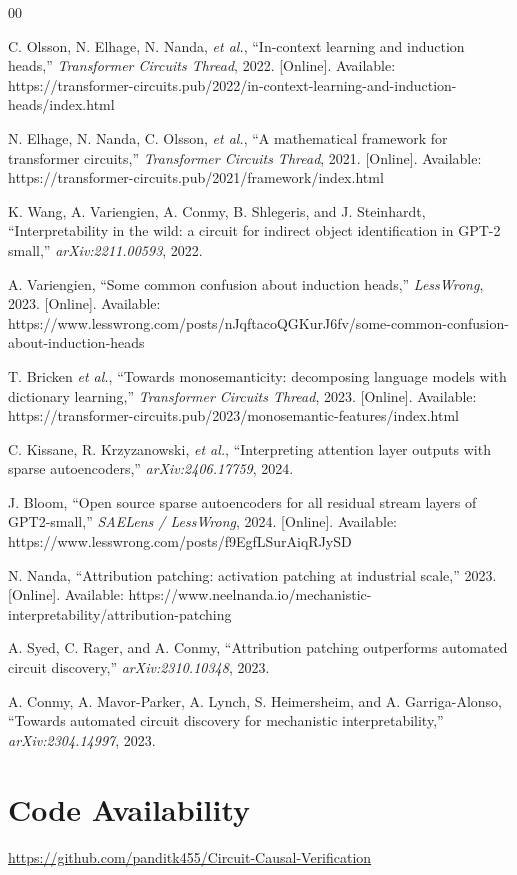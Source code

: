 \documentclass[conference]{IEEEtran}
\begin{document}
\begin{thebibliography}{00}

C. Olsson, N. Elhage, N. Nanda, \textit{et al.}, ``In-context learning and induction heads,'' \textit{Transformer Circuits Thread}, 2022. [Online]. Available: https://transformer-circuits.pub/2022/in-context-learning-and-induction-heads/index.html

N. Elhage, N. Nanda, C. Olsson, \textit{et al.}, ``A mathematical framework for transformer circuits,'' \textit{Transformer Circuits Thread}, 2021. [Online]. Available: https://transformer-circuits.pub/2021/framework/index.html

K. Wang, A. Variengien, A. Conmy, B. Shlegeris, and J. Steinhardt, ``Interpretability in the wild: a circuit for indirect object identification in GPT-2 small,'' \textit{arXiv:2211.00593}, 2022.

A. Variengien, ``Some common confusion about induction heads,'' \textit{LessWrong}, 2023. [Online]. Available: https://www.lesswrong.com/posts/nJqftacoQGKurJ6fv/some-common-confusion-about-induction-heads

T. Bricken \textit{et al.}, ``Towards monosemanticity: decomposing language models with dictionary learning,'' \textit{Transformer Circuits Thread}, 2023. [Online]. Available: https://transformer-circuits.pub/2023/monosemantic-features/index.html

C. Kissane, R. Krzyzanowski, \textit{et al.}, ``Interpreting attention layer outputs with sparse autoencoders,'' \textit{arXiv:2406.17759}, 2024.

J. Bloom, ``Open source sparse autoencoders for all residual stream layers of GPT2-small,'' \textit{SAELens / LessWrong}, 2024. [Online]. Available: https://www.lesswrong.com/posts/f9EgfLSurAiqRJySD

N. Nanda, ``Attribution patching: activation patching at industrial scale,'' 2023. [Online]. Available: https://www.neelnanda.io/mechanistic-interpretability/attribution-patching

A. Syed, C. Rager, and A. Conmy, ``Attribution patching outperforms automated circuit discovery,'' \textit{arXiv:2310.10348}, 2023.

A. Conmy, A. Mavor-Parker, A. Lynch, S. Heimersheim, and A. Garriga-Alonso, ``Towards automated circuit discovery for mechanistic interpretability,'' \textit{arXiv:2304.14997}, 2023.

\end{thebibliography}

\section{Code Availability}
\url{https://github.com/panditk455/Circuit-Causal-Verification}
\end{document}
